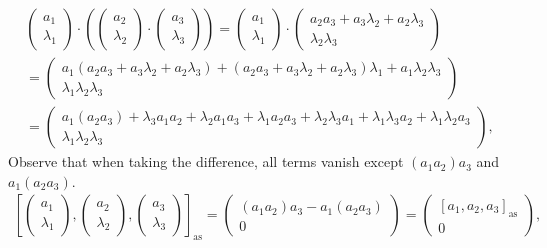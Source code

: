 \documentclass[12pt]{article}
\begin{document}
		\begin{multline*}
			\begin{pmatrix}
				a_1 \\ \lambda_1
			\end{pmatrix}\cdot\left(\begin{pmatrix}
				a_2 \\ \lambda_2
			\end{pmatrix}\cdot \begin{pmatrix}
				a_3 \\ \lambda_3
			\end{pmatrix}\right)=\begin{pmatrix}
				a_1 \\ \lambda_1
			\end{pmatrix}\cdot \begin{pmatrix}
				a_2a_3+a_3\lambda_2+a_2\lambda_3 \\ \lambda_2\lambda_3
			\end{pmatrix}\\
			=\begin{pmatrix}    a_1(a_2a_3+a_3\lambda_2+a_2\lambda_3)+(a_2a_3+a_3\lambda_2+a_2\lambda_3)\lambda_1+a_1\lambda_2\lambda_3 \\ \lambda_1\lambda_2\lambda_3
			\end{pmatrix}\\
			=\begin{pmatrix}
				a_1(a_2a_3)+\lambda_3a_1a_2+\lambda_2a_1a_3+\lambda_1a_2a_3+\lambda_2\lambda_3a_1+\lambda_1\lambda_3a_2+\lambda_1\lambda_2a_3 \\ \lambda_1\lambda_2\lambda_3
			\end{pmatrix},
		\end{multline*}
		Observe that when taking the difference, all terms vanish except $(a_1a_2)a_3$ and $a_1(a_2a_3)$.
		\begin{align*}
			\left[\begin{pmatrix}
				a_1 \\ \lambda_1
			\end{pmatrix},\begin{pmatrix}
				a_2 \\ \lambda_2
			\end{pmatrix}, \begin{pmatrix}
				a_3 \\ \lambda_3
			\end{pmatrix}\right]_{\mathrm{as}}=\begin{pmatrix}
				(a_1a_2)a_3 - a_1(a_2a_3) \\ 0
			\end{pmatrix}=\begin{pmatrix}
				[a_1,a_2,a_3]_{\mathrm{as}} \\ 0
			\end{pmatrix},
		\end{align*}
\end{document}
